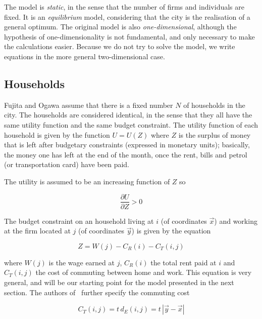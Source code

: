 The model is \emph{static}, in the sense that the number of firms and
individuals are fixed. It is an \emph{equilibrium} model, considering that the
city is the realisation of a general optimum. The original model is also
\emph{one-dimensional}, although the hypothesis of one-dimensionality is not
fundamental, and only necessary to make the calculations easier. Because we 
do not try to solve the model, we write equations in the more general
two-dimensional case.

\subsection{Households} 
\label{sub:households}

Fujita and Ogawa assume that there is a fixed number $N$ of households in the
city. The households are considered identical, in the sense that they all have
the same utility function and the same budget constraint. The utility function
of each household is given by the function $U = U(Z)$ where $Z$ is the surplus
of money that is left after budgetary constraints (expressed in monetary units);
basically, the money one has left at the end of the month, once the rent, bills
and petrol (or transportation card) have been paid. 

The utility is assumed to be an increasing function of $Z$ so

\begin{equation}
    \frac{\partial U}{\partial Z} > 0
\end{equation}

The budget constraint on an household living at $i$ (of coordinates $\vec{x}$)
and working at the firm located at $j$ (of coordinates $\vec{y}$) is given by the
equation

\begin{equation}
    Z = W\left(j\right)
      - C_R\left(i\right)
      - C_T\left(i,j\right)
\end{equation} 

where $W\left(j\right)$ is the wage earned at $j$, $C_R\left(i\right)$ the total
rent paid at $i$ and $C_T\left(i,j\right)$ the cost of commuting between
home and work. This equation is very general, and will be our starting point for
the model presented in the next section. The authors of~\cite{Fujita:1982}
further specify the commuting cost

\begin{equation}
    C_T\left(i,j\right) = t\,d_E(i,j) = t\,\left|\vec{y}-\vec{x}\right|
\end{equation}

